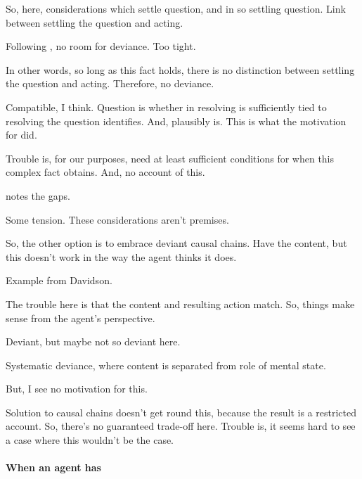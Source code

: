 \begin{note}
  So, here, considerations which settle question, and in so settling question.
  Link between settling the question and acting.

  Following \citeauthor{Hieronymi:2011aa}, no room for deviance.
  Too tight.

  In other words, so long as this fact holds, there is no distinction between settling the question and acting.
  Therefore, no deviance.

  Compatible, I think.
  Question is whether in resolving \qzS{} is sufficiently tied to resolving the question \citeauthor{Hieronymi:2011aa} identifies.
  And, plausibly is.
  This is what the motivation for \qzS{} did.

  Trouble is, for our purposes, need at least sufficient conditions for when this complex fact obtains.
  And, no account of this.

  \citeauthor{Hieronymi:2011aa} notes the gaps.

  Some tension.
  These considerations aren't premises.
\end{note}

\begin{note}
  So, the other option is to embrace deviant causal chains.
  Have the content, but this doesn't work in the way the agent thinks it does.

  Example from Davidson.

  The trouble here is that the content and resulting action match.
  So, things make sense from the agent's perspective.

  Deviant, but maybe not so deviant here.

  Systematic deviance, where content is separated from role of mental state.

  But, I see no motivation for this.

  Solution to causal chains doesn't get round this, because the result is a restricted account.
  So, there's no guaranteed trade-off here.
  Trouble is, it seems hard to see a case where this wouldn't be the case.
\end{note}

\paragraph{When an agent has \zS{}}

